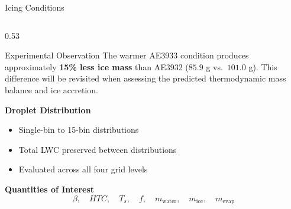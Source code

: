 \begin{frame}[shrink]{\small Icing Conditions}
\begin{columns}[T,onlytextwidth]
\begin{column}{0.53\textwidth}
\begin{block}{\scriptsize Experimental Observation}
The warmer AE3933 condition produces approximately \textbf{15\% less ice mass} than AE3932
($85.9$ g vs.\ $101.0$ g). This difference will be revisited when assessing the predicted
thermodynamic mass balance and ice accretion.
\end{block}

\textbf{Droplet Distribution}

\begin{itemize}
    \item Single-bin to 15-bin distributions
    \item Total LWC preserved between distributions
    \item Evaluated across all four grid levels
\end{itemize}


\textbf{Quantities of Interest}
\vspace{-0.25cm}
\[
\beta,\quad HTC,\quad T_s,\quad f,\quad
m_{\mathrm{water}},\quad m_{\mathrm{ice}},\quad
m_{\mathrm{evap}}
\]

\end{column}

\end{columns}

\end{frame}
